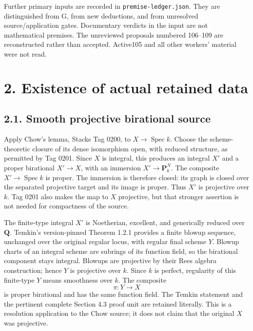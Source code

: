 \documentclass[
  10pt,
]{article}
\begin{document}
Further primary inputs are recorded in \texttt{premise-ledger.json}.
They are distinguished from G, from new deductions, and from unresolved
source/application gates. Documentary verdicts in the input are not
mathematical premises. The unreviewed proposals numbered 106--109 are
reconstructed rather than accepted. Active105 and all other workers'
material were not read.

\section{2. Existence of actual retained
data}\label{existence-of-actual-retained-data}

\subsection{2.1. Smooth projective birational
source}\label{smooth-projective-birational-source}

Apply Chow's lemma, Stacks Tag 0200, to \(X\to\operatorname{Spec}k\).
Choose the scheme-theoretic closure of its dense isomorphism open, with
reduced structure, as permitted by Tag 0201. Since \(X\) is integral,
this produces an integral \(X'\) and a proper birational \(X'\to X\),
with an immersion \(X'\to\mathbf P^N_k\). The composite
\(X'\to\operatorname{Spec}k\) is proper. The immersion is therefore
closed: its graph is closed over the separated projective target and its
image is proper. Thus \(X'\) is projective over \(k\). Tag 0201 also
makes the map to \(X\) projective, but that stronger assertion is not
needed for compactness of the source.

The finite-type integral \(X'\) is Noetherian, excellent, and
generically reduced over \(\mathbf Q\). Temkin's version-pinned Theorem
1.2.1 provides a finite blowup sequence, unchanged over the original
regular locus, with regular final scheme \(Y\). Blowup charts of an
integral scheme are subrings of its function field, so the birational
component stays integral. Blowups are projective by their Rees algebra
construction; hence \(Y\) is projective over \(k\). Since \(k\) is
perfect, regularity of this finite-type \(Y\) means smoothness over
\(k\). The composite \[
 \pi:Y\longrightarrow X
 \tag{2.1}
\] is proper birational and has the same function field. The Temkin
statement and the pertinent complete Section 4.3 proof unit are retained
literally. This is a resolution application to the Chow source; it does
not claim that the original \(X\) was projective.
\end{document}
